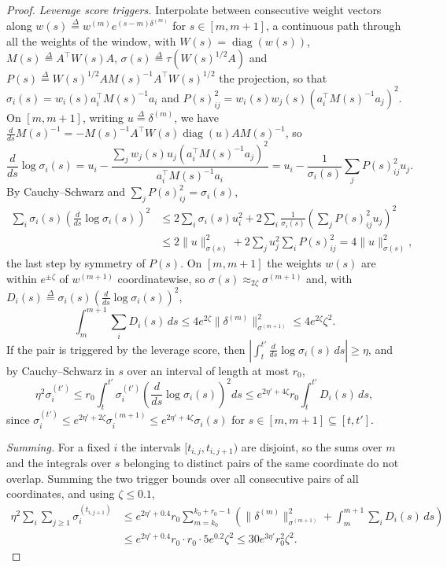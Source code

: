 \documentclass[11pt]{article}
\newcommand{\diag}{\operatorname{diag}}
\newcommand{\defeq}{\stackrel{\Delta}{=}}
\begin{document}
\begin{proof}
\emph{Leverage score triggers.}
Interpolate between consecutive weight vectors along
$w(s) \defeq w^{(m)} e^{(s - m) \delta^{(m)}}$ for
$s \in [m, m + 1]$, a continuous path through all the weights of the window,
with $W(s) = \diag(w(s))$,
$M(s) \defeq A^\top W(s) A$,
$\sigma(s) \defeq \tau(W(s)^{1/2} A)$ and
$P(s) \defeq W(s)^{1/2} A M(s)^{-1} A^\top W(s)^{1/2}$ the projection, so that
$\sigma_i(s) = w_i(s) a_i^\top M(s)^{-1} a_i$ and
$P(s)_{ij}^2 = w_i(s) w_j(s) (a_i^\top M(s)^{-1} a_j)^2$.
On $[m, m + 1]$, writing
$u \defeq \delta^{(m)}$, we have
$\frac{d}{ds} M(s)^{-1} = - M(s)^{-1} A^\top W(s) \diag(u) A M(s)^{-1}$, so
\[
\frac{d}{ds} \log \sigma_i(s)
=
u_i
-
\frac{\sum_j w_j(s) u_j (a_i^\top M(s)^{-1} a_j)^2}
{a_i^\top M(s)^{-1} a_i}
=
u_i
-
\frac{1}{\sigma_i(s)} \sum_j P(s)_{ij}^2 u_j .
\]
By Cauchy--Schwarz and $\sum_j P(s)_{ij}^2 = \sigma_i(s)$,
\begin{align*}
\sum_i \sigma_i(s)
\left( \frac{d}{ds} \log \sigma_i(s) \right)^2
&\le
2 \sum_i \sigma_i(s) u_i^2
+
2 \sum_i \frac{1}{\sigma_i(s)}
\left( \sum_j P(s)_{ij}^2 u_j \right)^2
\\
&\le
2 \|u\|_{\sigma(s)}^2
+
2 \sum_j u_j^2 \sum_i P(s)_{ij}^2
=
4 \|u\|_{\sigma(s)}^2 ,
\end{align*}
the last step by symmetry of $P(s)$.
On $[m, m + 1]$ the weights
$w(s)$ are within
$e^{\pm \zeta}$ of
$w^{(m + 1)}$ coordinatewise, so
$\sigma(s) \approx_{2 \zeta} \sigma^{(m + 1)}$ and, with
$D_i(s) \defeq \sigma_i(s) (\frac{d}{ds} \log \sigma_i(s))^2$,
\begin{equation}
\label{eq:lever_path_bound}
\int_m^{m + 1} \sum_i D_i(s) \, ds
\le
4 e^{2 \zeta} \|\delta^{(m)}\|_{\sigma^{(m + 1)}}^2
\le
4 e^{2 \zeta} \zeta^2 .
\end{equation}
If the pair is triggered by the leverage score, then
$|\int_t^{t'} \frac{d}{ds} \log \sigma_i(s) \, ds| \ge \eta$, and by
Cauchy--Schwarz in $s$ over an interval of length at most
$r_0$,
\[
\eta^{2} \sigma^{(t')}_i
\le
r_0 \int_t^{t'} \sigma^{(t')}_i
\left( \frac{d}{ds} \log \sigma_i(s) \right)^2 ds
\le
e^{2 \eta' + 4 \zeta} r_0 \int_t^{t'} D_i(s) \, ds ,
\]
since
$\sigma^{(t')}_i \le e^{2 \eta' + 2 \zeta} \sigma^{(m + 1)}_i \le e^{2 \eta' + 4 \zeta} \sigma_i(s)$
for $s \in [m, m + 1] \subseteq [t, t']$.

\emph{Summing.}
For a fixed $i$ the intervals
$[t_{i, j}, t_{i, j + 1})$ are disjoint, so the sums over
$m$ and the integrals over
$s$ belonging to distinct pairs of the same coordinate do not overlap.
Summing the two trigger bounds over all consecutive pairs of all coordinates,
and using $\zeta \le 0.1$,
\begin{align*}
\eta^{2} \sum_i \sum_{j \ge 1} \sigma_i^{(t_{i, j + 1})}
&\le
e^{2 \eta' + 0.4} r_0
\sum_{m = k_0}^{k_0 + r_0 - 1}
\left(
\|\delta^{(m)}\|_{\sigma^{(m + 1)}}^2
+
\int_m^{m + 1} \sum_i D_i(s) \, ds
\right)
\\
&\le
e^{2 \eta' + 0.4} r_0 \cdot r_0 \cdot 5 e^{0.2} \zeta^{2}
\le
30 e^{3 \eta'} r_0^{2} \zeta^{2} .
\end{align*}


\end{proof}
\end{document}
